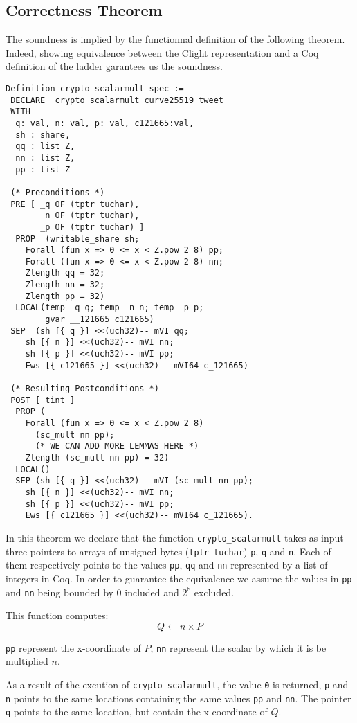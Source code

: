 \subsection{Correctness Theorem}

The soundness is implied by the functionnal definition of the following theorem.
Indeed, showing equivalence between the Clight representation and a Coq
definition of the ladder garantees us the soundness.

\begin{lstlisting}
Definition crypto_scalarmult_spec :=
 DECLARE _crypto_scalarmult_curve25519_tweet
 WITH
  q: val, n: val, p: val, c121665:val,
  sh : share,
  qq : list Z,
  nn : list Z,
  pp : list Z

 (* Preconditions *)
 PRE [ _q OF (tptr tuchar),
       _n OF (tptr tuchar),
       _p OF (tptr tuchar) ]
  PROP  (writable_share sh;
    Forall (fun x => 0 <= x < Z.pow 2 8) pp;
    Forall (fun x => 0 <= x < Z.pow 2 8) nn;
    Zlength qq = 32;
    Zlength nn = 32;
    Zlength pp = 32)
  LOCAL(temp _q q; temp _n n; temp _p p;
        gvar __121665 c121665)
 SEP  (sh [{ q }] <<(uch32)-- mVI qq;
    sh [{ n }] <<(uch32)-- mVI nn;
    sh [{ p }] <<(uch32)-- mVI pp;
    Ews [{ c121665 }] <<(uch32)-- mVI64 c_121665)

 (* Resulting Postconditions *)
 POST [ tint ]
  PROP (
    Forall (fun x => 0 <= x < Z.pow 2 8)
      (sc_mult nn pp);
      (* WE CAN ADD MORE LEMMAS HERE *)
    Zlength (sc_mult nn pp) = 32)
  LOCAL()
  SEP (sh [{ q }] <<(uch32)-- mVI (sc_mult nn pp);
    sh [{ n }] <<(uch32)-- mVI nn;
    sh [{ p }] <<(uch32)-- mVI pp;
    Ews [{ c121665 }] <<(uch32)-- mVI64 c_121665).
\end{lstlisting}

In this theorem we declare that the function \texttt{crypto\_scalarmult} takes as
input three pointers to arrays of unsigned bytes (\texttt{tptr tuchar}) \texttt{p},
\texttt{q} and \texttt{n}.
Each of them respectively points to the values \texttt{pp},  \texttt{qq} and  \texttt{nn}
represented by a list of integers in Coq. In order to guarantee the equivalence
we assume the values in \texttt{pp} and \texttt{nn} being bounded by $0$ included
and $2^8$ excluded.

This function computes: $$Q \leftarrow n \times P$$

\texttt{pp} represent the x-coordinate of $P$, \texttt{nn} represent the
scalar by which it is be multiplied $n$.

As a result of the excution of \texttt{crypto\_scalarmult}, the value \texttt{0} is returned,
\texttt{p} and \texttt{n} points to the same locations containing the same values \texttt{pp} and \texttt{nn}.
The pointer \texttt{q} points to the same location, but contain the x coordinate of $Q$.
